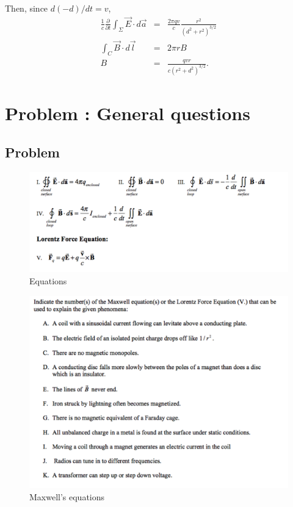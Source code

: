 \documentclass[solutions]{esg8022pset}
\begin{document}
Then, since $d(-d)/dt=v$,
\begin{eqnarray}
\frac{1}{c}\frac{\partial}{\partial t}\int_{\Sigma} \vec{E}\cdot
d\vec{a} &=& \frac{2\pi qv}{c}\frac{r^2}{(d^2+r^2)^{3/2}}\\
\int_C \vec{B}\cdot d\vec{l} &=& 2\pi rB\\
B&=& \frac{qvr}{c(r^2+d^2)^{3/2}}.
\end{eqnarray}


\section{Problem \thesection: General questions}
\subsection{Problem}
\begin{figure}[H]
    \centering
    \includegraphics[width = 15cm]{eqns}
    \caption{Equations}
  \end{figure}
\begin{figure}[H]
    \centering
    \includegraphics[width = 15cm]{max_gen}
    \caption{Maxwell's equations}
  \end{figure}
\end{document}

